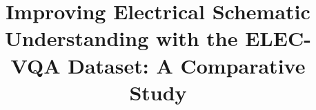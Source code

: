 \title{Improving Electrical Schematic Understanding with the ELEC-VQA Dataset: A Comparative Study}
\author{\phantom{Author name}}
\address{\phantom{Affiliation}}
\corresp{\phantom{Corresponding author}}
